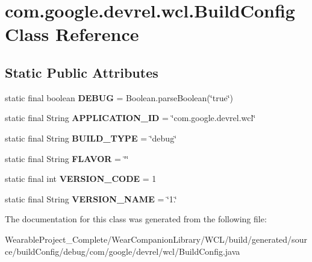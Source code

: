 \hypertarget{classcom_1_1google_1_1devrel_1_1wcl_1_1BuildConfig}{}\section{com.\+google.\+devrel.\+wcl.\+Build\+Config Class Reference}
\label{classcom_1_1google_1_1devrel_1_1wcl_1_1BuildConfig}
\subsection*{Static Public Attributes}
\begin{DoxyCompactItemize}
\item 
static final boolean {\bfseries D\+E\+B\+UG} = Boolean.\+parse\+Boolean(\char`\"{}true\char`\"{})\hypertarget{classcom_1_1google_1_1devrel_1_1wcl_1_1BuildConfig_a789861eadeeb4e1c38118cb7c86d0afa}{}\label{classcom_1_1google_1_1devrel_1_1wcl_1_1BuildConfig_a789861eadeeb4e1c38118cb7c86d0afa}

\item 
static final String {\bfseries A\+P\+P\+L\+I\+C\+A\+T\+I\+O\+N\+\_\+\+ID} = \char`\"{}com.\+google.\+devrel.\+wcl\char`\"{}\hypertarget{classcom_1_1google_1_1devrel_1_1wcl_1_1BuildConfig_a02b2c6a0c5c02fbd5bc7055071cdd684}{}\label{classcom_1_1google_1_1devrel_1_1wcl_1_1BuildConfig_a02b2c6a0c5c02fbd5bc7055071cdd684}

\item 
static final String {\bfseries B\+U\+I\+L\+D\+\_\+\+T\+Y\+PE} = \char`\"{}debug\char`\"{}\hypertarget{classcom_1_1google_1_1devrel_1_1wcl_1_1BuildConfig_ae7aed263f3b0484da419290ba3524c26}{}\label{classcom_1_1google_1_1devrel_1_1wcl_1_1BuildConfig_ae7aed263f3b0484da419290ba3524c26}

\item 
static final String {\bfseries F\+L\+A\+V\+OR} = \char`\"{}\char`\"{}\hypertarget{classcom_1_1google_1_1devrel_1_1wcl_1_1BuildConfig_ae729ba26dfc4b25f2047109024add2e2}{}\label{classcom_1_1google_1_1devrel_1_1wcl_1_1BuildConfig_ae729ba26dfc4b25f2047109024add2e2}

\item 
static final int {\bfseries V\+E\+R\+S\+I\+O\+N\+\_\+\+C\+O\+DE} = 1\hypertarget{classcom_1_1google_1_1devrel_1_1wcl_1_1BuildConfig_a6d7c66b7b96fb6cce6ae46b6458f2391}{}\label{classcom_1_1google_1_1devrel_1_1wcl_1_1BuildConfig_a6d7c66b7b96fb6cce6ae46b6458f2391}

\item 
static final String {\bfseries V\+E\+R\+S\+I\+O\+N\+\_\+\+N\+A\+ME} = \char`\"{}1.\char`\"{}\hypertarget{classcom_1_1google_1_1devrel_1_1wcl_1_1BuildConfig_a148c395815be7deefaa3488b95f89593}{}\label{classcom_1_1google_1_1devrel_1_1wcl_1_1BuildConfig_a148c395815be7deefaa3488b95f89593}

\end{DoxyCompactItemize}


The documentation for this class was generated from the following file\+:\begin{DoxyCompactItemize}
\item 
Wearable\+Project\+\_\+\+Complete/\+Wear\+Companion\+Library/\+W\+C\+L/build/generated/source/build\+Config/debug/com/google/devrel/wcl/Build\+Config.\+java\end{DoxyCompactItemize}

